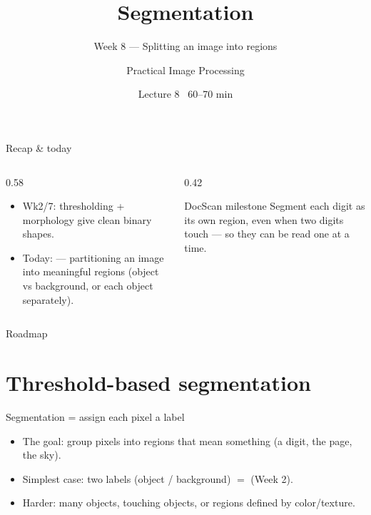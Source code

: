 \documentclass[10pt,aspectratio=169]{beamer}
\title{Segmentation}
\subtitle{Week 8 — Splitting an image into regions}
\author{Practical Image Processing}
\date{Lecture 8 \textbullet\ 60--70 min}
\begin{document}
\maketitle

\begin{frame}{Recap \& today}
  \begin{columns}[T]
    \begin{column}{0.58\textwidth}
      \begin{itemize}
        \item Wk2/7: thresholding + morphology give clean binary shapes.
        \item \alert{Today:}  — partitioning an image into meaningful regions
              (object vs background, or each object separately).
      \end{itemize}
    \end{column}
    \begin{column}{0.42\textwidth}
      \begin{alertblock}{DocScan milestone}
        Segment each digit as its own region, even when two digits touch — so they can be read
        one at a time.
      \end{alertblock}
    \end{column}
  \end{columns}
\end{frame}

\begin{frame}{Roadmap}\tableofcontents\end{frame}

\section{Threshold-based segmentation}

\begin{frame}{Segmentation = assign each pixel a label}
  \begin{itemize}
    \item The goal: group pixels into regions that mean something (a digit, the page, the sky).
    \item Simplest case: two labels (object / background) $=$  (Week 2).
    \item Harder: many objects, touching objects, or regions defined by color/texture.
  \end{itemize}
\end{frame}
\end{document}
